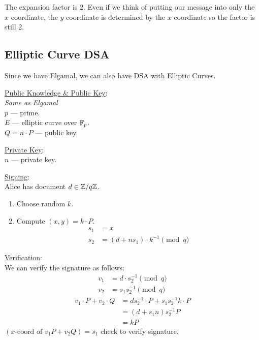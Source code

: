 The expansion factor is $2$. Even if we think of putting our message into only the $x$ coordinate, the $y$ coordinate is determined by the $x$ coordinate so the factor is still $2$.

\subsection{Elliptic Curve DSA}
Since we have Elgamal, we can also have DSA with Elliptic Curves.
\begin{mdframed}
    \ul{Public Knowledge \& Public Key}: \\
    \emph{Same as Elgamal} \\
    $p$ --- prime. \\
    $E$ --- elliptic curve over $\mathbb F_p$. \\
    $Q = n\cdot P$ --- public key.

    \ul{Private Key}: \\
    $n$ --- private key.

    \ul{Signing}: \\
    Alice has document $d\in \mathbb Z/q\mathbb Z$.
    \begin{enumerate}
        \item Choose random $k$.
        \item Compute $(x, y) = k\cdot P$.
              \begin{align*}
                  s_1 & = x                               \\
                  s_2 & = (d + ns_1)\cdot k^{-1} \pmod{q}
              \end{align*}
    \end{enumerate}

    \ul{Verification}: \\
    We can verify the signature as follows:
    \begin{align*}
        v_1 & = d\cdot s_2^{-1} \pmod{q} \\
        v_2 & = s_1s_2^{-1} \pmod{q}
    \end{align*}
    \begin{align*}
        v_1\cdot P + v_2\cdot Q & = ds_2^{-1}\cdot P + s_1s_2^{-1} k\cdot P \\
                                & = (d + s_1 n)s_2^{-1} P                   \\
                                & = k P
    \end{align*}
    $(\text{$x$-coord of }v_1P + v_2Q) = s_1$ check to verify signature.
\end{mdframed}

